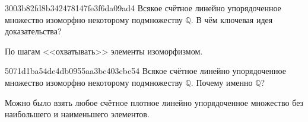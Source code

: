 \begin{note}{3003b82fd8b342478147fe3f6da09ad4}
    Всякое счётное линейно упорядоченное множество изоморфно некоторому подмножеству \({ \mathbb Q }\).
    В чём ключевая идея доказательства?

    \begin{cloze}{1}
        По шагам <<охватывать>> элементы изоморфизмом.
    \end{cloze}
\end{note}

\begin{note}{5071d1ba54de4db0955aa3bc403cbc54}
    Всякое счётное линейно упорядоченное множество изоморфно некоторому подмножеству \({ \mathbb Q }\).
    Почему именно \({ \mathbb Q }\)?

    \begin{cloze}{1}
        Можно было взять любое счётное плотное линейно упорядоченное множество без наибольшего и наименьшего элементов.
    \end{cloze}
\end{note}



